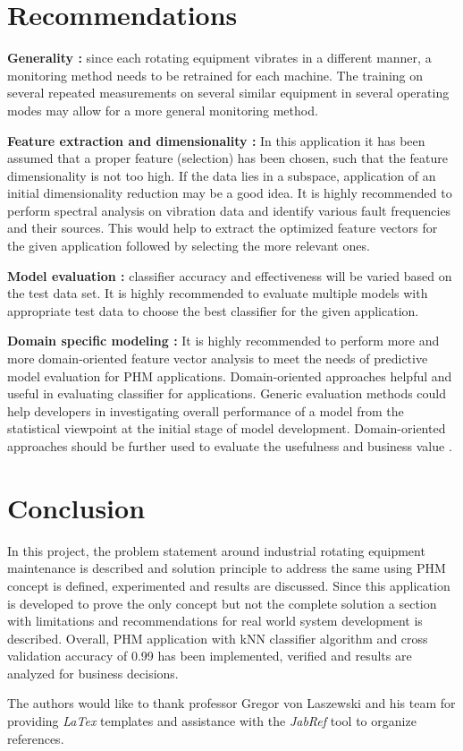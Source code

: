 \documentclass[sigconf]{acmart}
\begin{document}
\section{Recommendations}
\textbf{Generality :} since each rotating equipment vibrates in a different manner, a monitoring method needs to be retrained for each machine. The training on several repeated measurements on several similar equipment in several operating modes may allow for a more general monitoring method.

\textbf{Feature extraction and dimensionality :} In this application it has been assumed that a proper feature (selection) has been chosen, such that the feature dimensionality is not too high. If the data lies in a subspace, application of an initial dimensionality reduction may be a good idea. It is highly recommended to perform spectral analysis on vibration data and identify various fault frequencies and their sources. This would help to extract the optimized feature vectors for the given application followed by selecting the more relevant ones. 

\textbf{Model evaluation :} classifier accuracy and effectiveness will be varied based on the test data set. It is highly recommended to evaluate multiple models with appropriate test data to choose the best classifier for the given application.

\textbf{Domain specific modeling :} It is highly recommended to perform more and more domain-oriented feature vector analysis to meet the needs of predictive model evaluation for PHM applications. Domain-oriented approaches helpful and useful in evaluating classifier for applications. Generic evaluation methods could help developers in investigating overall performance of a model from the statistical viewpoint at the initial stage of model development. Domain-oriented approaches should be further used to evaluate the usefulness and business value \cite{Yang2014}.  

\section{Conclusion}
In this project, the problem statement around industrial rotating equipment maintenance is described and solution principle to address the same using PHM concept is defined, experimented and results are discussed. Since this application is developed to prove the only concept but not the complete solution a section with limitations and recommendations for real world system development is described. Overall, PHM application with kNN classifier algorithm and cross validation accuracy of 0.99 has been implemented, verified and results are analyzed for business decisions.
\begin{acks}

  The authors would like to thank professor Gregor von Laszewski and his team for providing \textit{LaTex} templates and assistance with the \textit{JabRef} tool to organize references.

\end{acks}
\end{document}

